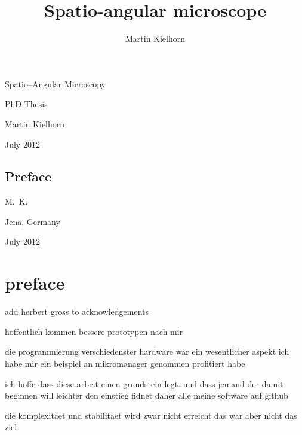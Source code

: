 \documentclass[oneside,a4paper,12pt,BCOR20mm,DIV14]{scrbook} %
\title{Spatio-angular microscope} %
\author{Martin Kielhorn}
\def\svgending{\ifx\pdfoutput\undefined%
  .eps_tex%
  \else%
  .pdf_tex%
  \fi}
\newcommand{\svginput}[2]{{\def\svgscale{#1}}}
\begin{document}
\listoftodos
\begin{titlepage}
  
  \hspace{-4cm}
  \svginput{1}{objective-trace}



  \vspace{-5cm}
  
  \hspace{4cm}\textsf{\Huge Spatio--Angular Microscopy}
  
  \vspace{2cm}
  \hspace{6cm}\textsf{\huge PhD Thesis}


  \vspace{3cm}
  \hspace{4cm}\textsf{\Large Martin Kielhorn}
  
  \vspace{1cm}
  \hspace{4cm}\textsf{\Large July 2012}
\end{titlepage}
\newpage

\section*{Preface}
\cite{Matthae2003} %
\begin{flushright}
  M.~K.
\end{flushright}

\noindent
Jena, Germany

\noindent
July 2012

\newpage
\tableofcontents
\printnomenclature

\chapter*{preface}
add herbert gross to acknowledgements

hoffentlich kommen bessere prototypen nach mir

die programmierung verschiedenster hardware war ein wesentlicher aspekt
ich habe mir ein beispiel an mikromanager genommen profitiert habe

ich hoffe dass diese arbeit einen grundstein legt.
und dass jemand der damit beginnen will leichter den einstieg fidnet
daher alle meine software auf github

die komplexitaet und stabilitaet wird zwar nicht erreicht
das war aber nicht das ziel
\end{document}
